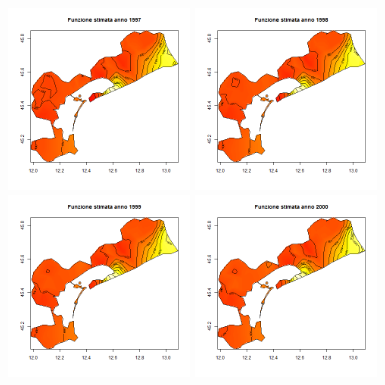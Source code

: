 \documentclass[a4paper,11pt,twoside,openright]{book}							%
\begin{document}
\newpage
\begin{figure}[H]
	\centering
	\includegraphics[width=0.43\textwidth ,height=0.235\textheight]{Immagini/venezia_senza_covariate/Anno1997.png}
	\includegraphics[width=0.43\textwidth ,height=0.235\textheight]{Immagini/venezia_senza_covariate/Anno1998.png}
	\includegraphics[width=0.43\textwidth ,height=0.235\textheight]{Immagini/venezia_senza_covariate/Anno1999.png}
	\includegraphics[width=0.43\textwidth ,height=0.235\textheight]{Immagini/venezia_senza_covariate/Anno2000.png}

\end{figure}
\end{document}
